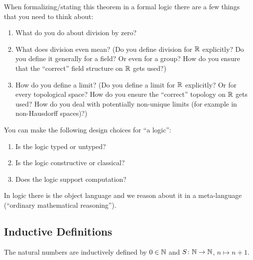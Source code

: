 \begin{rem}
When formalizing/stating this theorem in a formal logic there are a few things that you need to think about: 
\begin{enumerate}
    \item What do you do about division by zero?
    \item What does division even mean? (Do you define division for $\mathbb{R}$ explicitly? 
        Do you define it generally for a field? 
        Or even for a group? 
        How do you ensure that the ``correct'' field structure on $\mathbb{R}$ gets used?)
    \item How do you define a limit? (Do you define a limit for $\mathbb{R}$ explicitly? 
        Or for every topological space?
        How do you ensure the ``correct'' topology on $\mathbb{R}$ gets used? 
        How do you deal with potentially non-unique limits (for example in non-Hausdorff spaces)?)
\end{enumerate}
\end{rem}

\begin{rem}
You can make the following design choices for ``a logic'': 
\begin{enumerate}
    \item Is the logic typed or untyped?
    \item Is the logic constructive or classical?
    \item Does the logic support computation?
\end{enumerate}
\end{rem}

\begin{rem}
In logic there is the \alert{object language} and we reason about it in a \alert{meta-language} (``ordinary mathematical reasoning'').
\end{rem}

\subsection{Inductive Definitions}

\begin{example}
    The natural numbers are inductively defined by $0 \in \mathbb{N}$ and $S \colon \mathbb{N} \to \mathbb{N}$, $n \mapsto n + 1$. 
\end{example}


